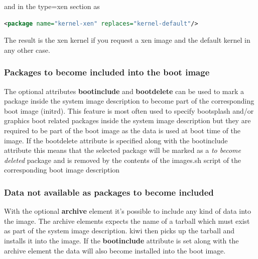 and in the type=xen section as

\begin{lstlisting}[language=xml]
<package name="kernel-xen" replaces="kernel-default"/>
\end{lstlisting}

The result is the xen kernel if you request a xen
image and the default kernel in any other case.

\subsubsection{Packages to become included into the boot image}
The optional attributes \textbf{bootinclude} and \textbf{bootdelete}
can be used to mark a package inside the system image description to
become part of the corresponding boot image (initrd). This feature
is most often used to specify bootsplash and/or graphics boot related
packages inside the system image description but they are required
to be part of the boot image as the data is used at boot time
of the image. If the bootdelete attribute is specified along with
the bootinclude attribute this means that the selected package
will be marked as a \textit{to become deleted} package and is
removed by the contents of the images.sh script of the corresponding
boot image description

\subsubsection{Data not available as packages to become included}
With the optional \textbf{archive} element it's possible to include
any kind of data into the image. The archive elements expects the
name of a tarball which must exist as part of the system image
description. kiwi then picks up the tarball and installs it into
the image. If the \textbf{bootinclude} attribute is set along with
the archive element the data will also become installed into the
boot image.



